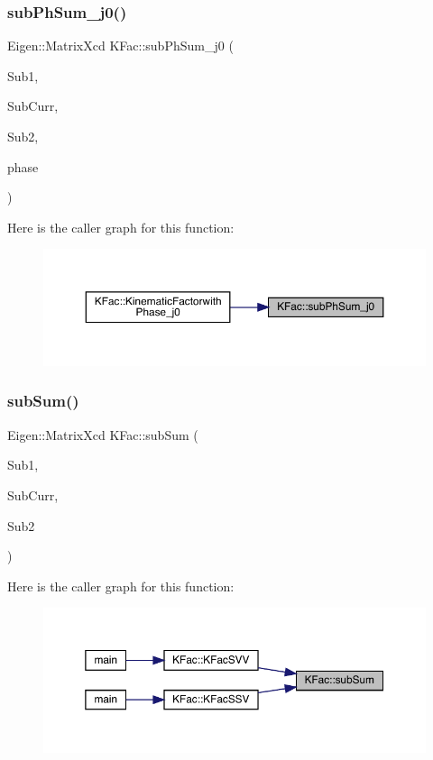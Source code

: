 \subsubsection{\texorpdfstring{subPhSum\_j0()}{subPhSum\_j0()}}
{\footnotesize\ttfamily Eigen\+::\+Matrix\+Xcd K\+Fac\+::sub\+Ph\+Sum\+\_\+j0 (\begin{DoxyParamCaption}\item[{map$<$ int, Eigen\+::\+Matrix\+Xcd $>$ \&}]{Sub1,  }\item[{Eigen\+::\+Matrix\+Xcd \&}]{Sub\+Curr,  }\item[{map$<$ int, Eigen\+::\+Matrix\+Xcd $>$ \&}]{Sub2,  }\item[{\mbox{\hyperlink{structPh_1_1phChars}{Ph\+::ph\+Chars}} \&}]{phase }\end{DoxyParamCaption})}

Here is the caller graph for this function\+:\nopagebreak
\begin{figure}[H]
\begin{center}
\leavevmode
\includegraphics[width=350pt]{d2/d89/namespaceKFac_abb86856b8424632f8f879408ce2cc05b_icgraph}
\end{center}
\end{figure}
\mbox{\label{namespaceKFac_a3eefd3c3b1834112b9b76444ef00895e}} 
\subsubsection{\texorpdfstring{subSum()}{subSum()}}
{\footnotesize\ttfamily Eigen\+::\+Matrix\+Xcd K\+Fac\+::sub\+Sum (\begin{DoxyParamCaption}\item[{map$<$ int, Eigen\+::\+Matrix\+Xcd $>$ \&}]{Sub1,  }\item[{map$<$ int, Eigen\+::\+Matrix\+Xcd $>$ \&}]{Sub\+Curr,  }\item[{map$<$ int, Eigen\+::\+Matrix\+Xcd $>$ \&}]{Sub2 }\end{DoxyParamCaption})}

Here is the caller graph for this function\+:\nopagebreak
\begin{figure}[H]
\begin{center}
\leavevmode
\includegraphics[width=350pt]{d2/d89/namespaceKFac_a3eefd3c3b1834112b9b76444ef00895e_icgraph}
\end{center}
\end{figure}
